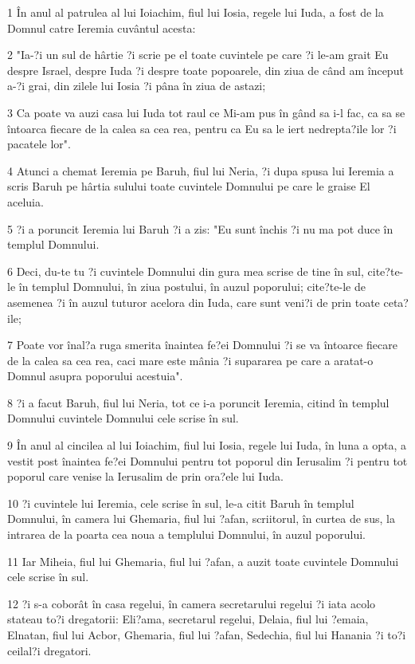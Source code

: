 \par 1 În anul al patrulea al lui Ioiachim, fiul lui Iosia, regele lui Iuda, a fost de la Domnul catre Ieremia cuvântul acesta:
\par 2 "Ia-?i un sul de hârtie ?i scrie pe el toate cuvintele pe care ?i le-am grait Eu despre Israel, despre Iuda ?i despre toate popoarele, din ziua de când am început a-?i grai, din zilele lui Iosia ?i pâna în ziua de astazi;
\par 3 Ca poate va auzi casa lui Iuda tot raul ce Mi-am pus în gând sa i-l fac, ca sa se întoarca fiecare de la calea sa cea rea, pentru ca Eu sa le iert nedrepta?ile lor ?i pacatele lor".
\par 4 Atunci a chemat Ieremia pe Baruh, fiul lui Neria, ?i dupa spusa lui Ieremia a scris Baruh pe hârtia sulului toate cuvintele Domnului pe care le graise El aceluia.
\par 5 ?i a poruncit Ieremia lui Baruh ?i a zis: "Eu sunt închis ?i nu ma pot duce în templul Domnului.
\par 6 Deci, du-te tu ?i cuvintele Domnului din gura mea scrise de tine în sul, cite?te-le în templul Domnului, în ziua postului, în auzul poporului; cite?te-le de asemenea ?i în auzul tuturor acelora din Iuda, care sunt veni?i de prin toate ceta?ile;
\par 7 Poate vor înal?a ruga smerita înaintea fe?ei Domnului ?i se va întoarce fiecare de la calea sa cea rea, caci mare este mânia ?i supararea pe care a aratat-o Domnul asupra poporului acestuia".
\par 8 ?i a facut Baruh, fiul lui Neria, tot ce i-a poruncit Ieremia, citind în templul Domnului cuvintele Domnului cele scrise în sul.
\par 9 În anul al cincilea al lui Ioiachim, fiul lui Iosia, regele lui Iuda, în luna a opta, a vestit post înaintea fe?ei Domnului pentru tot poporul din Ierusalim ?i pentru tot poporul care venise la Ierusalim de prin ora?ele lui Iuda.
\par 10 ?i cuvintele lui Ieremia, cele scrise în sul, le-a citit Baruh în templul Domnului, în camera lui Ghemaria, fiul lui ?afan, scriitorul, în curtea de sus, la intrarea de la poarta cea noua a templului Domnului, în auzul poporului.
\par 11 Iar Miheia, fiul lui Ghemaria, fiul lui ?afan, a auzit toate cuvintele Domnului cele scrise în sul.
\par 12 ?i s-a coborât în casa regelui, în camera secretarului regelui ?i iata acolo stateau to?i dregatorii: Eli?ama, secretarul regelui, Delaia, fiul lui ?emaia, Elnatan, fiul lui Acbor, Ghemaria, fiul lui ?afan, Sedechia, fiul lui Hanania ?i to?i ceilal?i dregatori.
